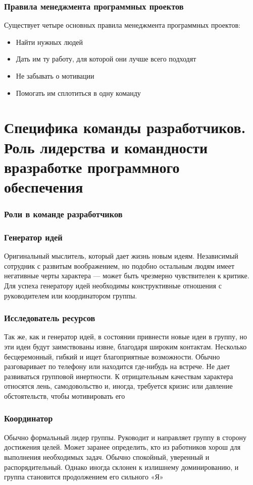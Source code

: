\documentclass{../industrial-development}
\begin{document}
\begin{frame} \frametitle{Правила менеджмента программных проектов}

Существует четыре основных правила менеджмента программных проектов:
  \begin{itemize}
  \item Найти нужных людей
  \item Дать им ту работу, для которой они лучше всего подходят
  \item Не забывать о мотивации
  \item Помогать им сплотиться в одну команду 
  \end{itemize}
\end{frame}

\section{Специфика команды разработчиков. Роль лидерства и командности вразработке программного обеспечения}

\begin{frame} \frametitle{Роли в команде разработчиков}
\end{frame}

\begin{frame} \frametitle{Генератор идей}
Оригинальный мыслитель, который дает жизнь новым идеям. Независимый сотрудник с развитым воображением, но подобно остальным людям имеет негативные черты характера — может быть чрезмерно чувствителен к критике. Для успеха генератору идей необходимы конструктивные отношения с руководителем или координатором группы.
\end{frame}


\begin{frame} \frametitle{Исследователь ресурсов}
Так же, как и генератор идей, в состоянии привнести новые идеи в группу, но эти идеи будут заимствованы извне, благодаря широким контактам. Несколько бесцеремонный, гибкий и ищет благоприятные возможности. Обычно разговаривает по телефону или находится где-нибудь на встрече. Не дает развиваться групповой инертности. К отрицательным качествам характера относятся лень, самодовольство и, иногда, требуется кризис или давление обстоятельств, чтобы мотивировать его
\end{frame}

\begin{frame} \frametitle{Координатор}
Обычно формальный лидер группы. Руководит и направляет группу в сторону достижения целей. Может заранее определить, кто из работников хорош для выполнения необходимых задач. Обычно спокойный, уверенный и распорядительный. Однако иногда склонен к излишнему доминированию, и группа становится продолжением его сильного «Я»
\end{frame}
\end{document}
